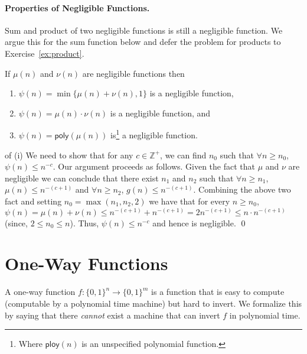 \paragraph{Properties of Negligible Functions.} Sum and product of two negligible functions is still a negligible function. We argue this for the sum function below and defer the problem for products to Exercise~\ref{ex:product}.

\begin{lemma}
If $\mu(n)$ and $\nu(n)$ are negligible functions then\begin{enumerate}
\item $\psi(n) = \min\{\mu(n) + \nu(n),1\}$ is a negligible function,
\item $\psi(n) = \mu(n) \cdot \nu(n)$ is a negligible function, and
\item $\psi(n) = \mathsf{poly}(\mu(n))$ is\footnote{Where $\mathsf{ploy}(n)$ is an unspecified polynomial function.} a negligible function.
\end{enumerate}
\end{lemma}

\proof of (i) We need to show that for any $c \in \mathbb{Z}^+$, we can find $n_0$ such that $\forall n \geq n_0$, $\psi(n) \leq n^{-c}$. Our argument proceeds as follows. Given the fact that $\mu$ and $\nu$ are negligible we can conclude that there exist $n_1$ and $n_2$ such that $\forall n \geq n_1$, $\mu(n) \leq n^{-(c+1)}$ and $\forall n \geq n_2$, $g(n) \leq n^{-(c+1)}$. Combining the above two fact and setting $n_0 = \max(n_1, n_2, 2)$ we have that for every $n \geq n_0$,
$\psi(n) = \mu(n) + \nu(n) \leq n^{-(c+1)} + n^{-(c+1)} = 2 n^{-(c+1)} \leq n \cdot n^{-(c+1)}$ (since, $2 \leq n_0 \leq n$).
Thus, $\psi(n) \leq n^{-c}$ and hence is negligible.  \qed

%



\section{One-Way Functions}
\label{ssec:owf}
A one-way function $f: \{0,1\}^n \rightarrow \{0,1\}^m$ is a function that is easy to compute (computable by a polynomial time machine) but hard to invert.  We formalize this by saying that there {\em cannot} exist a machine that can invert $f$ in polynomial time. 

